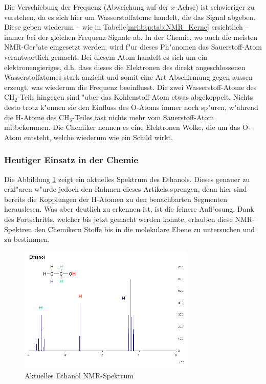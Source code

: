 Die Verschiebung der Frequenz (Abweichung auf der $x$-Achse) ist schwieriger zu verstehen, da es sich hier um Wasserstoffatome handelt, die das Signal abgeben. Diese geben wiederum -- wie in Tabelle\;\ref{mri:bsp:tab:NMR_Kerne} ersichtlich -- immer bei der gleichen Frequenz Signale ab. In der Chemie, wo auch die meisten NMR-Ger"ate eingesetzt werden, wird f"ur dieses Ph"anomen das Sauerstoff-Atom verantwortlich gemacht. Bei diesem Atom handelt es sich um ein elektronengieriges, d.h. dass dieses die Elektronen des direkt angeschlossenen Wasserstoffatomes stark anzieht und somit eine Art Abschirmung gegen aussen erzeugt, was wiederum die Frequenz beeinflusst. Die zwei Wasserstoff-Atome des $\mathrm{CH_2}$-Teils hingegen sind "uber das Kohlenstoff-Atom etwas abgekoppelt. Nichts desto trotz k"onnen sie den Einfluss des O-Atoms immer noch sp"uren, w"ahrend die H-Atome des $\mathrm{CH_3}$-Teiles fast nichts mehr vom Sauerstoff-Atom mitbekommen. Die Chemiker nennen es eine Elektronen Wolke, die um das O-Atom entsteht, welche wiederum wie ein Schild wirkt.

\subsubsection{Heutiger Einsatz in der Chemie}
Die Abbildung \ref{mri:bsp:abb:EtanolspektrumNew} zeigt ein aktuelles Spektrum des Ethanols. Dieses genauer zu erkl"aren w"urde jedoch den Rahmen dieses Artikels sprengen, denn hier sind bereits die Kopplungen der H-Atomen zu den benachbarten Segmenten herauslesen. Was aber deutlich zu erkennen ist, ist die feinere Aufl"osung. Dank des Fortschritts, welcher bis jetzt gemacht werden konnte, erlauben diese NMR-Spektren den Chemikern Stoffe bis in die molekulare Ebene zu untersuchen und zu bestimmen. 
\begin{figure}
	\centering
	\includegraphics[width = 0.75\textwidth]{./mri/pic/CW_SpektrumEthanol_Neu.png}
	\caption{Aktuelles Ethanol NMR-Spektrum \cite{skript:mri:EthanolNeu}}
	\label{mri:bsp:abb:EtanolspektrumNew}
\end{figure}
